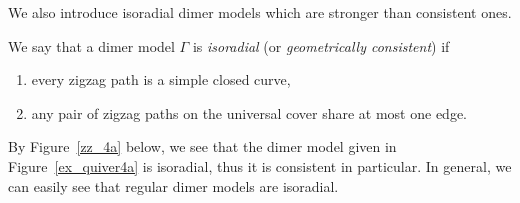 We also introduce isoradial dimer models which are stronger than consistent ones.

\begin{defi}\label{def_isoradial}
We say that a dimer model $\Gamma$ is \emph{isoradial} (or \emph{geometrically consistent}) if
\begin{enumerate}[\rm(1)]
\item every zigzag path is a simple closed curve,
\item any pair of zigzag paths on the universal cover share at most one edge.
\end{enumerate}
\end{defi}

By Figure~\ref{zz_4a} below, we see that the dimer model given in Figure~\ref{ex_quiver4a} is isoradial, thus it is consistent in particular. In general, we can easily see that regular dimer models are isoradial.


